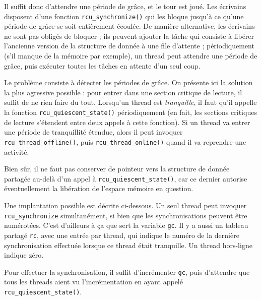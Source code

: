Il suffit donc d'attendre une période de grâce, et le tour est joué. Les
écrivains disposent d'une fonction \texttt{rcu\_synchronize()} qui les bloque
jusqu'à ce qu'une période de grâce se soit entièrement écoulée. De manière
alternative, les écrivains ne sont pas obligés de bloquer ; ils peuvent ajouter
la tâche qui consiste à libérer l'ancienne version de la structure de donnée à
une file d'attente ; périodiquement (s'il manque de la mémoire par exemple), un
thread peut attendre une période de grâce, puis exécuter toutes les tâches en
attente d'un seul coup.

Le problème consiste à détecter les périodes de grâce. On présente ici la
solution la plus agressive possible : pour entrer dans une section critique de
lecture, il suffit de ne rien faire du tout. Lorsqu'un thread est
\emph{tranquille}, il faut qu'il appelle la fonction
\texttt{rcu\_quiescent\_state()} périodiquement (en fait, les sections critiques
de lecture s'étendent entre deux appels à cette fonction). Si un thread va
entrer une période de tranquillité étendue, alors il peut invoquer
\texttt{rcu\_thread\_offline()}, puis \texttt{rcu\_thread\_online()} quand il va
reprendre une activité.

Bien sûr, il ne faut pas conserver de pointeur vers la structure de donnée
partagée au-delà d'un appel à \texttt{rcu\_quiescent\_state()}, car ce dernier
autorise éventuellement la libération de l'espace mémoire en question.

Une implantation possible est décrite ci-dessous. Un seul thread peut invoquer
\texttt{rcu\_synchronize} simultanément, si bien que les \og
synchronisations\fg{} peuvent être numérotées. C'est d'ailleurs à ça que sert la
variable \texttt{gc}. Il y a aussi un tableau partagé \texttt{rc}, avec une
entrée par thread, qui indique le numéro de la dernière synchronisation
effectuée lorsque ce thread était tranquille. Un thread hors-ligne indique zéro.

Pour effectuer la synchronisation, il suffit d'incrémenter \texttt{gc}, puis
d'attendre que tous les threads aient \og vu\fg{} l'incrémentation en ayant
appelé \texttt{rcu\_quiescent\_state()}.

